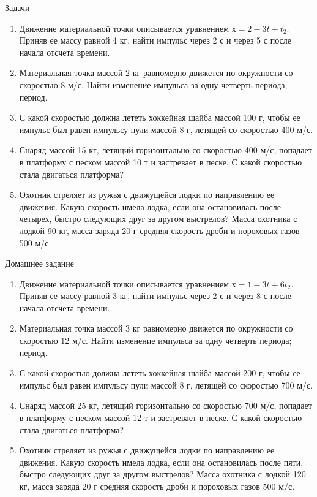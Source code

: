\documentclass[a5paper, 10pt]{diss_4}
\renewcommand{\'}{\,'}
\begin{document}
\begin{center}
   Задачи
\end{center}
\begin{enumerate}
\item Движение материальной точки описывается уравнением $х = 2 - 3t + t_2$. Приняв ее массу равной 4 кг, найти импульс через 2 с и через 5 с после начала отсчета времени.
\item Материальная точка массой 2 кг равномерно движется по окружности со скоростью 8 м/с. Найти изменение импульса за одну четверть периода; период.
\item С какой скоростью должна лететь хоккейная шайба массой 100 г, чтобы ее импульс был равен импульсу пули массой 8 г, летящей со скоростью 400 м/с.
\item Снаряд массой 15 кг, летящий горизонтально со скоростью 400 м/с, попадает в платформу с песком массой 10 т и застревает в песке. С какой скоростью стала двигаться платформа?
\item Охотник стреляет из ружья с движущейся лодки по направлению ее движения. Какую скорость имела лодка, если она остановилась после четырех, быстро следующих друг за другом выстрелов? Масса охотника с лодкой 90 кг, масса заряда 20 г средняя скорость дроби и пороховых газов 500 м/с.
\end{enumerate}

\begin{center}
   Домашнее задание
\end{center}
\begin{enumerate}
\item Движение материальной точки описывается уравнением $х = 1 - 3t + 6t_2$. Приняв ее массу равной 3 кг, найти импульс через 2 с и через 8 с после начала отсчета времени.
\item Материальная точка массой 3 кг равномерно движется по окружности со скоростью 12 м/с. Найти изменение импульса за одну четверть периода; период.
\item С какой скоростью должна лететь хоккейная шайба массой 200 г, чтобы ее импульс был равен импульсу пули массой 8 г, летящей со скоростью 700 м/с.
\item Снаряд массой 25 кг, летящий горизонтально со скоростью 700 м/с, попадает в платформу с песком массой 12 т и застревает в песке. С какой скоростью стала двигаться платформа?
\item Охотник стреляет из ружья с движущейся лодки по направлению ее движения. Какую скорость имела лодка, если она остановилась после пяти, быстро следующих друг за другом выстрелов? Масса охотника с лодкой 120 кг, масса заряда 20 г средняя скорость дроби и пороховых газов 500 м/с.
\end{enumerate}
\end{document}
